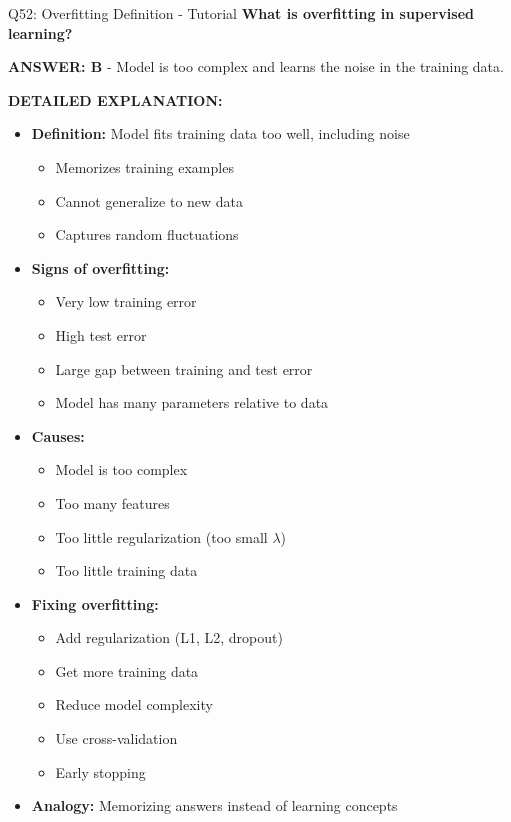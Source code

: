 \documentclass[8pt]{beamer}
\begin{document}
	\begin{frame}{Q52: Overfitting Definition - Tutorial}
		\fontsize{6.5}{7.5}\selectfont
		\textbf{What is overfitting in supervised learning?}
		
		\vspace{0.05cm}
		\textcolor{myblue}{\textbf{ANSWER: B}} - Model is too complex and learns the noise in the training data.
		
		\vspace{0.05cm}
		\textbf{DETAILED EXPLANATION:}
		\begin{itemize}
			\item \textbf{Definition:} Model fits training data too well, including noise
			\begin{itemize}
				\item Memorizes training examples
				\item Cannot generalize to new data
				\item Captures random fluctuations
			\end{itemize}
			\item \textbf{Signs of overfitting:}
			\begin{itemize}
				\item Very low training error
				\item High test error
				\item Large gap between training and test error
				\item Model has many parameters relative to data
			\end{itemize}
			\item \textbf{Causes:}
			\begin{itemize}
				\item Model is too complex
				\item Too many features
				\item Too little regularization (too small $\lambda$)
				\item Too little training data
			\end{itemize}
			\item \textbf{Fixing overfitting:}
			\begin{itemize}
				\item Add regularization (L1, L2, dropout)
				\item Get more training data
				\item Reduce model complexity
				\item Use cross-validation
				\item Early stopping
			\end{itemize}
			\item \textbf{Analogy:} Memorizing answers instead of learning concepts
		\end{itemize}
		

\end{frame}
\end{document}
